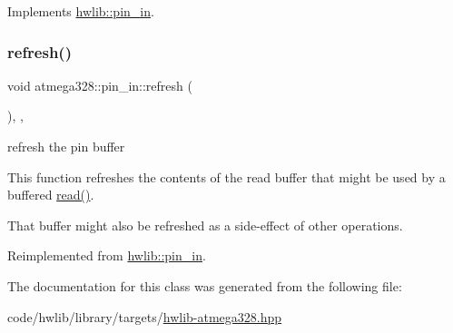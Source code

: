 Implements \hyperlink{classhwlib_1_1pin__in_ad071bd2e17bb4af51390f6cbb728a194}{hwlib\+::pin\+\_\+in}.

\mbox{\label{classatmega328_1_1pin__in_a5582f55d2e2d857e941002a7c16cea8f}} 
\subsubsection{\texorpdfstring{refresh()}{refresh()}}
{\footnotesize\ttfamily void atmega328\+::pin\+\_\+in\+::refresh (\begin{DoxyParamCaption}{ }\end{DoxyParamCaption})\hspace{0.3cm}{\ttfamily [inline]}, {\ttfamily [override]}, {\ttfamily [virtual]}}





refresh the pin buffer

This function refreshes the contents of the read buffer that might be used by a buffered \hyperlink{classatmega328_1_1pin__in_a77953ce4da1daee0511822ebae5f80e9}{read()}.

That buffer might also be refreshed as a side-\/effect of other operations. 

Reimplemented from \hyperlink{classhwlib_1_1pin__in_a3fb1bfb1ec962bb6d31a5e865f0d0acb}{hwlib\+::pin\+\_\+in}.



The documentation for this class was generated from the following file\+:\begin{DoxyCompactItemize}
\item 
code/hwlib/library/targets/\hyperlink{hwlib-atmega328_8hpp}{hwlib-\/atmega328.\+hpp}\end{DoxyCompactItemize}
